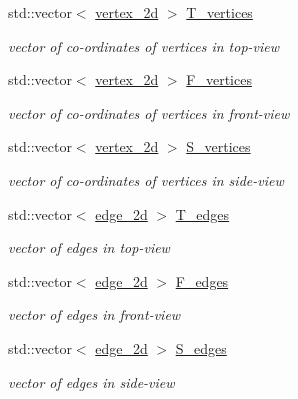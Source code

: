 \begin{DoxyCompactItemize}
\item 
std\+::vector$<$ \hyperlink{classvertex__2d}{vertex\+\_\+2d} $>$ \hyperlink{classobject__2d_aedcad81ef4cdb308ffade7bcf7de4cc2}{T\+\_\+vertices}
\begin{DoxyCompactList}\small\item\em vector of co-\/ordinates of vertices in top-\/view \end{DoxyCompactList}\item 
std\+::vector$<$ \hyperlink{classvertex__2d}{vertex\+\_\+2d} $>$ \hyperlink{classobject__2d_aa12b4ac9f646748a83b22c7a81ff1b7c}{F\+\_\+vertices}
\begin{DoxyCompactList}\small\item\em vector of co-\/ordinates of vertices in front-\/view \end{DoxyCompactList}\item 
std\+::vector$<$ \hyperlink{classvertex__2d}{vertex\+\_\+2d} $>$ \hyperlink{classobject__2d_a722b0505e408b8864809a7ae55c86df4}{S\+\_\+vertices}
\begin{DoxyCompactList}\small\item\em vector of co-\/ordinates of vertices in side-\/view \end{DoxyCompactList}\item 
std\+::vector$<$ \hyperlink{classedge__2d}{edge\+\_\+2d} $>$ \hyperlink{classobject__2d_a1543063eb017187a7582821d1ec07faf}{T\+\_\+edges}
\begin{DoxyCompactList}\small\item\em vector of edges in top-\/view \end{DoxyCompactList}\item 
std\+::vector$<$ \hyperlink{classedge__2d}{edge\+\_\+2d} $>$ \hyperlink{classobject__2d_abb23f1e7a00cef6deba5d997ff40a751}{F\+\_\+edges}
\begin{DoxyCompactList}\small\item\em vector of edges in front-\/view \end{DoxyCompactList}\item 
std\+::vector$<$ \hyperlink{classedge__2d}{edge\+\_\+2d} $>$ \hyperlink{classobject__2d_ad13cc39539ebc9c5634ae59dea81e33c}{S\+\_\+edges}
\begin{DoxyCompactList}\small\item\em vector of edges in side-\/view \end{DoxyCompactList}\end{DoxyCompactItemize}


